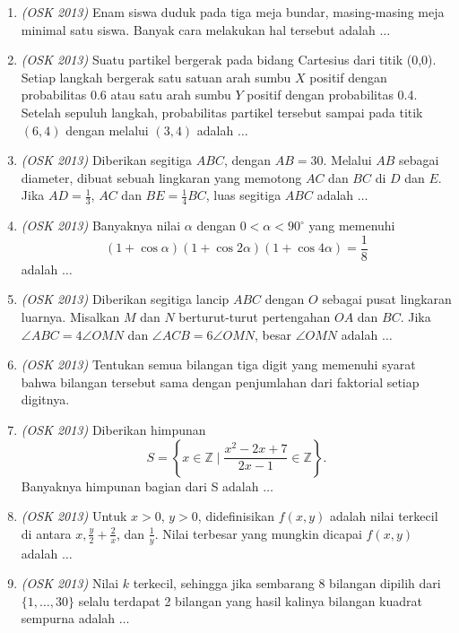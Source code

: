 \begin{enumerate}
	\item \textit{(OSK 2013)} Enam siswa duduk pada tiga meja bundar, masing-masing meja minimal satu siswa. Banyak cara melakukan hal tersebut adalah $\dots$
	
	\item \textit{(OSK 2013)} Suatu partikel bergerak pada bidang Cartesius dari titik (0,0). Setiap langkah bergerak satu satuan arah sumbu $X$ positif dengan probabilitas 0.6 atau satu arah sumbu $Y$ positif dengan probabilitas 0.4. Setelah sepuluh langkah, probabilitas partikel tersebut sampai pada titik $(6,4)$ dengan melalui $(3,4)$ adalah $\dots$
	
	\item \textit{(OSK 2013)} Diberikan segitiga $ABC$, dengan $AB = 30$. Melalui $AB$ sebagai diameter, dibuat sebuah lingkaran yang memotong $AC$ dan $BC$ di $D$ dan $E$. Jika $AD = \frac{1}{3}$, $AC$ dan $BE = \frac{1}{4}BC$, luas segitiga $ABC$ adalah $\dots$
	
	\item \textit{(OSK 2013)} Banyaknya nilai $\alpha$ dengan $0 < \alpha < 90^\circ$ yang memenuhi 
	\[
	(1 + \cos \alpha)(1 + \cos 2\alpha)(1 + \cos 4\alpha) = \frac{1}{8}
	\]
	adalah $\dots$
	
	\item \textit{(OSK 2013)} Diberikan segitiga lancip $ABC$ dengan $O$ sebagai pusat lingkaran luarnya. Misalkan $M$ dan $N$ berturut-turut pertengahan $OA$ dan $BC$. Jika $\angle ABC = 4\angle OMN$ dan $\angle ACB = 6\angle OMN$, besar $\angle OMN$ adalah $\dots$
	
	\item \textit{(OSK 2013)} Tentukan semua bilangan tiga digit yang memenuhi syarat bahwa bilangan tersebut sama dengan penjumlahan dari faktorial setiap digitnya.
	
	\item \textit{(OSK 2013)} Diberikan himpunan
	\[
	S = \left\{ x \in \mathbb{Z} \mid \frac{x^2 - 2x + 7}{2x - 1} \in \mathbb{Z} \right\}.\]
	Banyaknya himpunan bagian dari S adalah $\dots$
	
	\item \textit{(OSK 2013)} Untuk $x > 0$, $y > 0$, didefinisikan $f(x,y)$ adalah nilai terkecil di antara $x, \frac{y}{2}+\frac{2}{x}$, dan $\frac{1}{y}$. Nilai terbesar yang mungkin dicapai $f(x,y)$ adalah $\dots$
	
	\item \textit{(OSK 2013)} Nilai $k$ terkecil, sehingga jika sembarang 8 bilangan dipilih dari $\{1,\dots,30\}$ selalu terdapat 2 bilangan yang hasil kalinya bilangan kuadrat sempurna adalah $\dots$
	

\end{enumerate}
